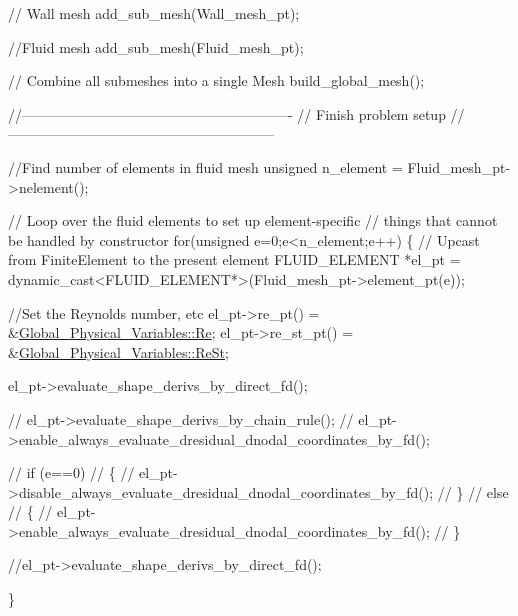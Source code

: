 \begin{DoxyCodeInclude}
{ \textcolor{comment}{// Wall mesh}
 add\_sub\_mesh(Wall\_mesh\_pt);

 \textcolor{comment}{//Fluid mesh}
 add\_sub\_mesh(Fluid\_mesh\_pt);

 \textcolor{comment}{// Combine all submeshes into a single Mesh}
 build\_global\_mesh();
 

 \textcolor{comment}{//----------------------------------------------------------}
 \textcolor{comment}{// Finish problem setup}
 \textcolor{comment}{// ---------------------------------------------------------}

 \textcolor{comment}{//Find number of elements in fluid mesh}
 \textcolor{keywordtype}{unsigned} n\_element = Fluid\_mesh\_pt->nelement();

 \textcolor{comment}{// Loop over the fluid elements to set up element-specific }
 \textcolor{comment}{// things that cannot be handled by constructor}
 \textcolor{keywordflow}{for}(\textcolor{keywordtype}{unsigned} e=0;e<n\_element;e++)
  \{
   \textcolor{comment}{// Upcast from FiniteElement to the present element}
   FLUID\_ELEMENT *el\_pt 
    = \textcolor{keyword}{dynamic\_cast<}FLUID\_ELEMENT*\textcolor{keyword}{>}(Fluid\_mesh\_pt->element\_pt(e));

   \textcolor{comment}{//Set the Reynolds number, etc}
   el\_pt->re\_pt() = &\hyperlink{namespaceGlobal__Physical__Variables_ab814e627d2eb5bc50318879d19ab16b9}{Global\_Physical\_Variables::Re};
   el\_pt->re\_st\_pt() = &\hyperlink{namespaceGlobal__Physical__Variables_a085ee4bf968ffdd01a41b8c41864f907}{Global\_Physical\_Variables::ReSt};


   el\_pt->evaluate\_shape\_derivs\_by\_direct\_fd();       

\textcolor{comment}{//   el\_pt->evaluate\_shape\_derivs\_by\_chain\_rule();}
\textcolor{comment}{//   el\_pt->enable\_always\_evaluate\_dresidual\_dnodal\_coordinates\_by\_fd();}

\textcolor{comment}{//    if (e==0)}
\textcolor{comment}{//     \{}
\textcolor{comment}{//      el\_pt->disable\_always\_evaluate\_dresidual\_dnodal\_coordinates\_by\_fd();}
\textcolor{comment}{//     \}}
\textcolor{comment}{//    else}
\textcolor{comment}{//     \{}
\textcolor{comment}{//      el\_pt->enable\_always\_evaluate\_dresidual\_dnodal\_coordinates\_by\_fd();}
\textcolor{comment}{//     \}}

   \textcolor{comment}{//el\_pt->evaluate\_shape\_derivs\_by\_direct\_fd();       }

  \}
 
}
\end{DoxyCodeInclude}

